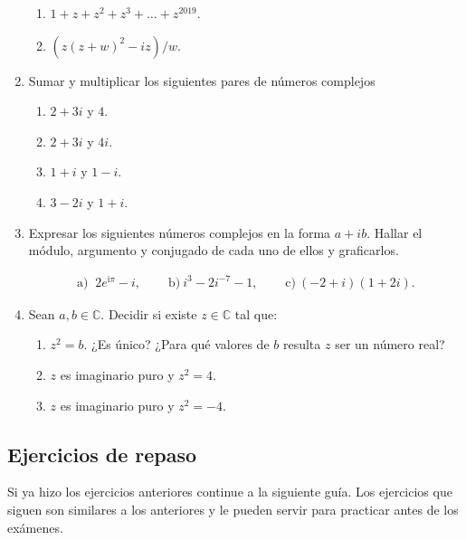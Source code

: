 \documentclass[a4paper,12pt,twoside,spanish,reqno]{amsbook}
\numberwithin{equation}{section}
\begin{document}
\begin{enumerate}
\begin{enumerate}
  \item $1+z+z^2+z^3+\dots+z^{2019}$.

  \item $(z(z+w)^2-iz)/w$.
 \end{enumerate}


\vspace{.5cm}


\item Sumar y multiplicar los siguientes pares de números complejos
    \begin{enumerate}
        \item $2+ 3i$ y $4$.
        \item $2+ 3i$ y $4i$.
        \item $1 + i$ y $ 1 -i$.
        \item $3-2i$ y $1 +i$. 
    \end{enumerate}

\vspace{.5cm}


 \item Expresar los siguientes n{ú}meros complejos en la forma $a +i b$.
 Hallar el módulo, argumento y conjugado de cada uno de ellos y graficarlos.

 $$\begin{array}{lll}
 \text{a) }\ 2e^{\mathrm{i}\pi}-i,  \quad & \text{ b)} \  i^3 - 2i^{-7} -1, \quad &\text{ c)}\ (-2+i) (1+2i).
  \end{array}$$

\vspace{.5cm}

\item Sean $a,b\in\mathbb{C}$. Decidir si existe $z \in \mathbb{C}$ tal que:
\begin{enumerate}
  \item $z^2=b$. ¿Es único? ¿Para qué valores de $b$ resulta $z$ ser un número real?
  \item $z$ es imaginario puro y $z^2=4$.
  \item $z$ es imaginario puro y $z^2=-4$.
\end{enumerate}



\end{enumerate}

\subsection*{Ejercicios de repaso} Si ya hizo los ejercicios anteriores continue a la siguiente guía. Los ejercicios que siguen son similares a los anteriores y le pueden servir para practicar antes de los exámenes.
\end{document}
